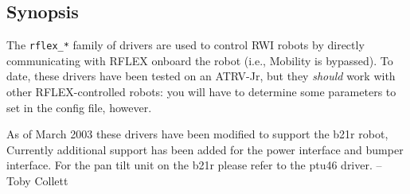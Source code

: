 \subsection*{Synopsis}
The {\tt rflex\_*} family of drivers are used to control RWI robots by directly
communicating with RFLEX onboard the robot (i.e., Mobility is bypassed).
To date, these drivers have been tested on an ATRV-Jr, but they {\em should}
work with other RFLEX-controlled robots: you will have to determine some
parameters to set in the config file, however.

As of March 2003 these drivers have been modified to support the b21r robot,
Currently additional support has been added for the power interface and bumper interface. For the pan tilt unit on the b21r please refer to the ptu46 driver. -- Toby Collett


